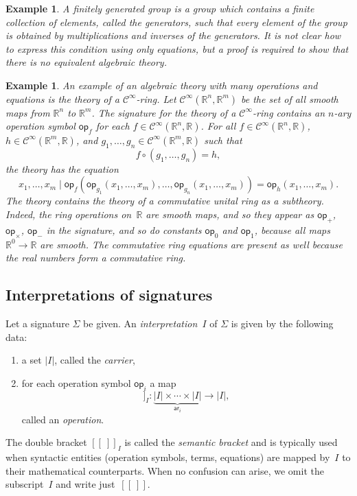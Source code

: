 \documentclass{amsart}
\newcommand{\RR}{\mathbb{R}} %
\newcommand{\carrier}[1]{|#1|} %
\newcommand{\op}[1]{\mathsf{op}_{#1}} %
\newcommand{\arity}[1]{\mathsf{ar}_{#1}} %
\newcommand{\Cinfty}{\mathcal{C}^\infty}
\newcommand{\sem}[1]{[\![#1]\!]} %
\newtheorem{example}[definition]{Example}
\begin{document}
\begin{example}
  \label{ex:finitely-generated-group}
  A \emph{finitely generated group} is a group which contains a finite collection of
  elements, called the \emph{generators}, such that every element of the group is obtained
  by multiplications and inverses of the generators. It is not clear how to express this
  condition using only equations, but a proof is required to show that there is no
  equivalent algebraic theory.
\end{example}

\begin{example}
  \label{ex:Cinfty-theory}
  An example of an algebraic theory with many operations and equations is the theory of a
  $\Cinfty$-ring. Let $\Cinfty(\RR^n, \RR^m)$ be the set of all smooth maps from $\RR^n$
  to $\RR^m$. The signature for the theory of a $\Cinfty$-ring contains an $n$-ary
  operation symbol $\op{f}$ for each $f \in \Cinfty(\RR^n, \RR)$. For all
  $f \in \Cinfty(\RR^n, \RR)$, $h \in \Cinfty(\RR^m, \RR)$, and
  $g_1, \ldots, g_n \in \Cinfty(\RR^m, \RR)$ such that
  \begin{equation*}
    f \circ (g_1, \ldots, g_n) = h,
  \end{equation*}
  the theory has the equation
  \begin{equation*}
    x_1, \ldots, x_m \mid
    \op{f} (\op{g_1}(x_1, \ldots, x_m), \ldots, \op{g_n}(x_1, \ldots, x_m)) =
    \op{h}(x_1, \ldots, x_m).
  \end{equation*}
  The theory contains the theory of a commutative unital ring as a subtheory. Indeed,
  the ring operations on~$\RR$ are smooth maps, and so they appear as $\op{+}$,
  $\op{\times}$, $\op{-}$ in the signature, and so do constants $\op{0}$ and $\op{1}$,
  because all maps $\RR^0 \to \RR$ are smooth. The commutative ring equations are present
  as well because the real numbers form a commutative ring.
\end{example}


\subsection{Interpretations of signatures}
\label{sec:interp-of-sign}

Let a signature $\Sigma$ be given. An \emph{interpretation~$I$} of $\Sigma$ is given by
the following data:
%
\begin{enumerate}
\item a set $\carrier{I}$, called the \emph{carrier},
\item for each operation symbol $\op{i}$ a map
  \begin{equation*}
    \sem{\op{i}}_I : \underbrace{\carrier{I} \times \cdots \times \carrier{I}}_{\arity{i}} \to \carrier{I},
  \end{equation*}
  called an \emph{operation}.
\end{enumerate}
%
The double bracket $\sem{{\ }}_I$ is called the \emph{semantic bracket} and is typically
used when syntactic entities (operation symbols, terms, equations) are mapped by~$I$ to
their mathematical counterparts. When no confusion can arise, we omit the subscript~$I$
and write just~$\sem{{\ }}$.
\end{document}
